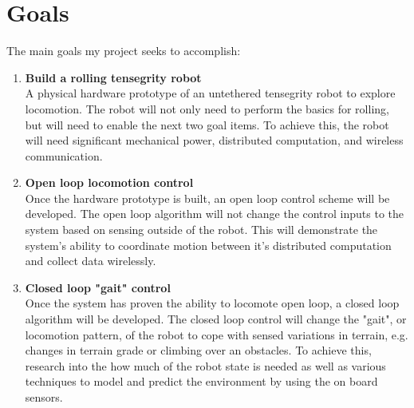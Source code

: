 \section{Goals}
\label{goal}
The main goals my project seeks to accomplish:

\begin{enumerate}[leftmargin=.5cm]
\item \textbf{Build a rolling tensegrity robot}\\
A physical hardware prototype of an untethered tensegrity robot to explore locomotion.
The robot will not only need to perform the basics for rolling, but will need to enable the next two goal items.
To achieve this, the robot will need significant mechanical power, distributed computation, and wireless communication.

\item \textbf{Open loop locomotion control}\\
Once the hardware prototype is built, an open loop control scheme will be developed.
The open loop algorithm will not change the control inputs to the system based on sensing outside of the robot.
This will demonstrate the system's ability to coordinate motion between it's distributed computation and collect data wirelessly.

\item \textbf{Closed loop "gait" control}\\
Once the system has proven the ability to locomote open loop, a closed loop algorithm will be developed.
The closed loop control will change the "gait", or locomotion pattern, of the robot to cope with sensed variations in terrain, e.g. changes in terrain grade or climbing over an obstacles.
To achieve this, research into the how much of the robot state is needed as well as various techniques to model and predict the environment by using the on board sensors.
\end{enumerate}
